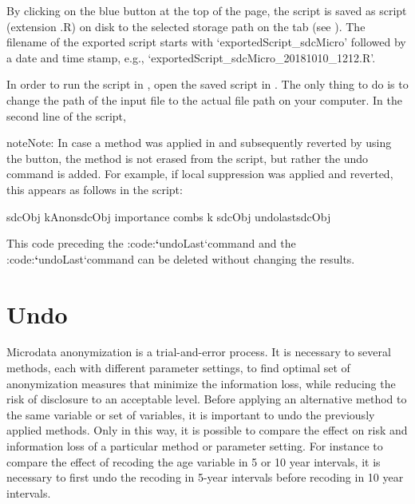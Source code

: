 \documentclass[letterpaper,10pt,english]{sphinxmanual}
\begin{document}
By clicking on the blue button  at the top of the page, the script
is saved as  script (extension .R) on disk to the selected storage path on the
 tab (see ).
The filename of the exported script starts with ‘exportedScript\_sdcMicro’ followed
by a date and time stamp, e.g., ‘exportedScript\_sdcMicro\_20181010\_1212.R’.

In order to run the script in , open the saved script in . The only
thing to do is to change the path of the input file to the actual file path on your computer.
In the second line of the  script,

\begin{sphinxadmonition}{note}{Note:}
In case a method was applied in  and subsequently reverted by using the 
button, the method is not erased from the script, but rather the undo command is added.
For example, if local suppression was applied and reverted, this appears as follows in
the script:

%
\begin{sphinxVerbatim}[commandchars=\\\{\},numbers=left,firstnumber=1,stepnumber=1]
sdcObj  kAnonsdcObj importance combs k
sdcObj  undolastsdcObj
\end{sphinxVerbatim}

This code preceding the :code:{\color{red}\bfseries{}{}`}undoLast{}`command and the :code:{\color{red}\bfseries{}{}`}undoLast{}`command
can be deleted without changing the results.
\end{sphinxadmonition}


\chapter{Undo}
\label{\detokenize{undo:undo}}\label{\detokenize{undo::doc}}
Microdata anonymization is a trial-and-error process. It is necessary to several
methods, each with different parameter settings, to find optimal set of
anonymization measures that minimize the information loss, while reducing the risk of
disclosure to an acceptable level. Before applying an alternative method to the same
variable or set of variables, it is important to undo the previously applied methods.
Only in this way, it is possible to compare the effect on risk and information
loss of a particular method or parameter setting. For instance to compare the
effect of recoding the age variable in 5 or 10 year intervals, it is necessary to first
undo the recoding in 5-year intervals before recoding in 10 year intervals.
\end{document}
